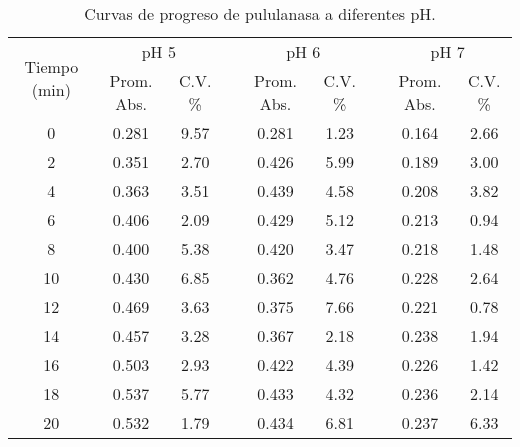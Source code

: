 \documentclass{article}
\begin{document}
\begin{table}[H]
	\centering
	\caption{Curvas de progreso de pululanasa a diferentes pH.}
	\begin{tabular}{ccccccccc}
		\toprule
		\multirow{2}[4]{*}{Tiempo (min)} & \multicolumn{2}{c}{ pH 5} &       & \multicolumn{2}{c}{pH 6} &       & \multicolumn{2}{c}{pH 7} \\
		\cmidrule{2-3}\cmidrule{5-6}\cmidrule{8-9}          & Prom. Abs. & C.V. \% &       & Prom. Abs. & C.V. \% &       & Prom. Abs. & C.V. \% \\
		\midrule
		0     & 0.281 & 9.57  &       & 0.281 & 1.23  &       & 0.164 & 2.66 \\
		2     & 0.351 & 2.70  &       & 0.426 & 5.99  &       & 0.189 & 3.00 \\
		4     & 0.363 & 3.51  &       & 0.439 & 4.58  &       & 0.208 & 3.82 \\
		6     & 0.406 & 2.09  &       & 0.429 & 5.12  &       & 0.213 & 0.94 \\
		8     & 0.400 & 5.38  &       & 0.420 & 3.47  &       & 0.218 & 1.48 \\
		10    & 0.430 & 6.85  &       & 0.362 & 4.76  &       & 0.228 & 2.64 \\
		12    & 0.469 & 3.63  &       & 0.375 & 7.66  &       & 0.221 & 0.78 \\
		14    & 0.457 & 3.28  &       & 0.367 & 2.18  &       & 0.238 & 1.94 \\
		16    & 0.503 & 2.93  &       & 0.422 & 4.39  &       & 0.226 & 1.42 \\
		18    & 0.537 & 5.77  &       & 0.433 & 4.32  &       & 0.236 & 2.14 \\
		20    & 0.532 & 1.79  &       & 0.434 & 6.81  &       & 0.237 & 6.33 \\
		\bottomrule
	\end{tabular}%
	\label{tab:b3}%
\end{table}%
\end{document}

